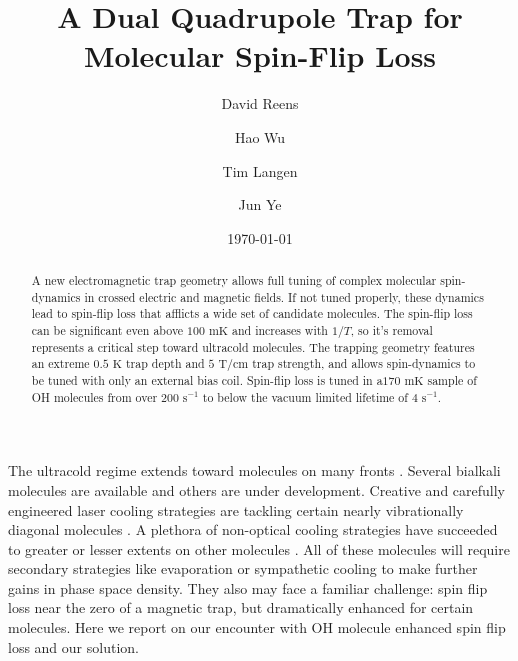 \documentclass[%
 reprint,
 amsmath,amssymb,
 aps,
prl,
]{revtex4-1}
\begin{document}

\title{A Dual Quadrupole Trap for Molecular Spin-Flip Loss}%


\author{David Reens}%
\author{Hao Wu}
\author{Tim Langen}%
\author{Jun Ye}
%

\date{\today}%


\begin{abstract}
A new electromagnetic trap geometry allows full tuning of complex molecular spin-dynamics in crossed electric and magnetic fields. If not tuned properly, these dynamics lead to spin-flip loss that afflicts a wide set of candidate molecules. The spin-flip loss can be significant even above $100\text{ mK}$ and increases with $1/T$, so it's removal represents a critical step toward ultracold molecules. The trapping geometry features an extreme  $0.5 \text{ K}$ trap depth and $5 \text{ T/cm}$ trap strength, and allows spin-dynamics to be tuned with only an external bias coil. Spin-flip loss is tuned in a$170 \text{ mK}$ sample of OH molecules from over $200 \text{ s}^{-1} $ to below the vacuum limited lifetime of $4 \text{ s}^{-1}$.
\end{abstract}


\maketitle


%
%
The ultracold regime extends toward molecules on many fronts \cite{Carr2009}. Several bialkali molecules are available \cite{Ni2008, Takekoshi2014, Park2015} and others are under development. Creative and carefully engineered laser cooling strategies are tackling certain nearly vibrationally diagonal molecules \cite{Steinecker2016, Barry2014, Hemmerling2016, Hummon2013, Zhelyazkova2014}. A plethora of non-optical cooling strategies have succeeded to greater or lesser extents on other molecules \cite{Doyle1998,Prehn2016,Bethlem1999,Bochinski2003,Akerman2015}. All of these molecules will require secondary strategies like evaporation or sympathetic cooling to make further gains in phase space density. They also may face a familiar challenge: spin flip loss near the zero of a magnetic trap, but dramatically enhanced for certain molecules. Here we report on our encounter with OH molecule enhanced spin flip loss and our solution.
\end{document}
